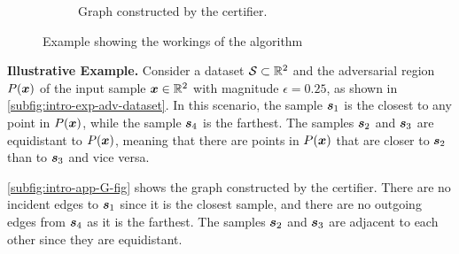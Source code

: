 \begin{figure}[h]
\begin{subfigure}{0.4\linewidth}
		\captionsetup{justification=centering}
		\caption{Graph constructed by the certifier.}
		\label{subfig:intro-app-G-fig}
	\end{subfigure}

	\caption[Example showing the algorithm]{Example showing the workings of the algorithm}
	\label{fig:intr-app-g-example}
\end{figure}

\noindent \textbf{Illustrative Example.} Consider a dataset $\set \subset \mathbb{R}^2$ and the adversarial region $P(\vinput)$ of the input sample $\vinput \in \mathbb{R}^2$ with magnitude $\epsilon = 0.25$, as shown in \autoref{subfig:intro-exp-adv-dataset}. In this scenario, the sample $\sample[1]$ is the closest to any point in $P(\vinput)$, while the sample $\sample[4]$ is the farthest. The samples $\sample[2]$ and $\sample[3]$ are equidistant to $P(\vinput)$, meaning that there are points in $P(\vinput)$ that are closer to $\sample[2]$ than to $\sample[3]$ and vice versa.

\autoref{subfig:intro-app-G-fig} shows the graph constructed by the certifier. There are no incident edges to $\sample[1]$ since it is the closest sample, and there are no outgoing edges from $\sample[4]$ as it is the farthest. The samples $\sample[2]$ and $\sample[3]$ are adjacent to each other since they are equidistant.

